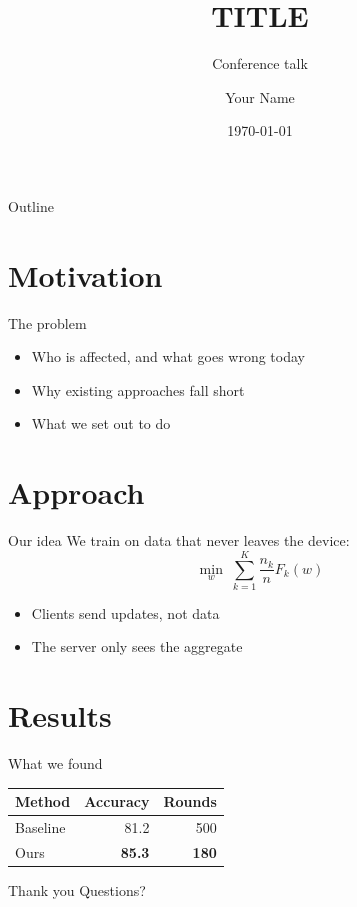 \documentclass[aspectratio=169]{beamer}
\title{{{TITLE}}}
\subtitle{Conference talk}
\author{Your Name}
\institute{University One}
\date{\today}
\begin{document}
\begin{frame}
  \titlepage
\end{frame}

\begin{frame}{Outline}
  \tableofcontents
\end{frame}

\section{Motivation}

\begin{frame}{The problem}
  \begin{itemize}
    \item Who is affected, and what goes wrong today
    \item Why existing approaches fall short
    \item What we set out to do
  \end{itemize}
\end{frame}

\section{Approach}

\begin{frame}{Our idea}
  We train on data that never leaves the device:
  \[
    \min_{w} \; \sum_{k=1}^{K} \frac{n_k}{n} F_k(w)
  \]
  \begin{itemize}
    \item Clients send updates, not data
    \item The server only sees the aggregate
  \end{itemize}
\end{frame}

\section{Results}

\begin{frame}{What we found}
  \centering
  \begin{tabular}{lrr}
    \toprule
    Method & Accuracy & Rounds \\
    \midrule
    Baseline & 81.2 & 500 \\
    Ours & \textbf{85.3} & \textbf{180} \\
    \bottomrule
  \end{tabular}
\end{frame}

\begin{frame}{Thank you}
  \centering Questions?
\end{frame}
\end{document}
